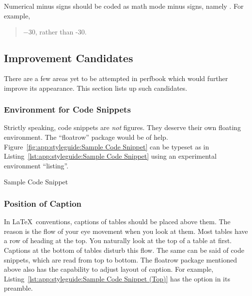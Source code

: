 Numerical minus signs should be coded as math mode minus signs,
namely \qco{$-$}. For example,

\begin{quote}
  $-30$, rather than -30.
\end{quote}

\subsection{Improvement Candidates}
\label{sec:app:styleguide:Improvement Candidates}

There are a few areas yet to be attempted in perfbook
which would further improve its appearance.
This section lists up such candidates.

\subsubsection{Environment for Code Snippets}
\label{sec:app:styleguide:Environment for Code Snippets}

Strictly speaking, code snippets are \emph{not} figures.
They deserve their own floating environment.
The ``floatrow'' package would be of help.
Figure~\ref{fig:app:styleguide:Sample Code Snippet}
can be typeset as in
Listing~\ref{lst:app:styleguide:Sample Code Snippet}
using an experimental environment ``listing''.

\begin{listing}
{ \scriptsize
{}
}
\centering
\theverbbox
\caption{Sample Code Snippet}
\label{lst:app:styleguide:Sample Code Snippet}
\end{listing}

\subsubsection{Position of Caption}
\label{sec:app:styleguide:Position of Caption}

In \LaTeX\ conventions, captions of tables should be placed
above them. The reason is the flow of your eye movement
when you look at them. Most tables have a row of heading at the
top. You naturally look at the top of a table at first. Captions at
the bottom of tables disturb this flow.
The same can be said of code snippets, which are read from
top to bottom.
The floatrow package mentioned above also has the capability
to adjust layout of caption.
For example,
Listing~\ref{lst:app:styleguide:Sample Code Snippet (Top)}
has the option  in its preamble.

